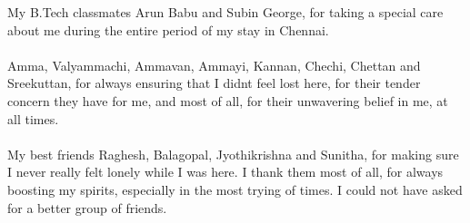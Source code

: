 {My B.Tech classmates Arun Babu and Subin George, for taking a special care about me during the entire period of my stay in Chennai.\\\\
Amma, Valyammachi, Ammavan, Ammayi, Kannan, Chechi, Chettan and Sreekuttan, for always ensuring that I didnt feel lost here, for their tender concern
 they have for me, and most of all, for their unwavering belief in me, at all times.\\\\
My best friends Raghesh, Balagopal, Jyothikrishna and Sunitha, for making sure I never really felt lonely while I was here. I thank them most of all, for always boosting my spirits, especially in the most trying of times. I could not have asked for a better group of friends.
}









